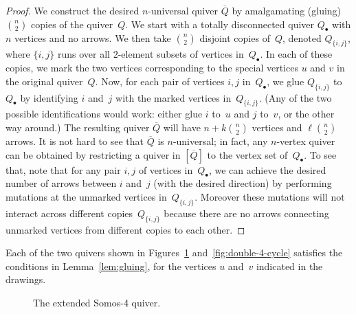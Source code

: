 \documentclass[ALCO,ThmDefs,Unicode,epreuves,published]{cedram}
\begin{document}
\begin{proof}
We construct the desired $n$-universal quiver $\overline Q$ by amalgamating (gluing) $\binom{n}{2}$ copies of the quiver~$Q$. 
We start with a totally disconnected quiver $Q_\bullet$ with $n$ vertices and no arrows. 
We then take $\binom{n}{2}$ disjoint copies of~$Q$, denoted $Q_{\{i,j\}}$, where $\{i,j\}$ runs over all $2$-element subsets of vertices in~$Q_\bullet$. 
In each of these copies, we mark the two vertices corresponding to the special vertices $u$ and $v$ in the original quiver~$Q$. 
Now, for each pair of vertices $i,j$ in~$Q_\bullet$, we glue $Q_{\{i,j\}}$ to~$Q_\bullet$ by identifying $i$ and~$j$ with the marked vertices in~$Q_{\{i,j\}}$. (Any of the two possible identifications would work: either glue $i$ to~$u$ and $j$ to~$v$, or the other way around.) The resulting quiver $\overline Q$ will have $n+k\binom{n}{2}$ vertices and $\ell\binom{n}{2}$ arrows. It is not hard to see that $\overline Q$ is \hbox{$n$-universal}; in fact, any $n$-vertex quiver can be obtained by restricting a quiver in $[\overline Q]$ to the vertex set of~$Q_\bullet$. To see that, note that for any pair $i,j$ of vertices in~$Q_\bullet$, we can achieve the desired number of arrows between $i$ and~$j$ (with the desired direction) by performing mutations at the unmarked vertices in~$Q_{\{i,j\}}$. Moreover these mutations will not interact across different copies~$Q_{\{i,j\}}$ because there are no arrows connecting unmarked vertices from different copies to each other. 
\end{proof}


\begin{lemma}
\label{lem:6-vertex-quivers}
Each of the two quivers shown in Figures~\ref{fig:extended-somos-4}
and~\ref{fig:double-4-cycle}
satisfies the conditions in Lemma~\ref{lem:gluing}, for the vertices $u$ and~$v$ indicated in the drawings. 
\end{lemma}

\begin{figure}[ht]\centering
{}
\caption{The extended Somos-4 quiver.}
\label{fig:extended-somos-4}
\end{figure}
\end{document}
